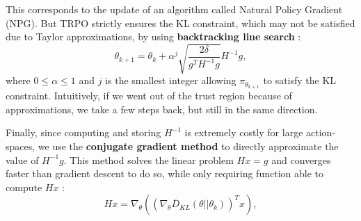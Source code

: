 \documentclass[10pt,landscape]{article}
\begin{document}
\begin{multicols}{3}
This corresponds to the update of an algorithm called Natural Policy Gradient (NPG). But TRPO strictly ensures the KL constraint, which may not be satisfied due to Taylor approximations, by using \textbf{backtracking line search} :
$$ \theta_{k+1} = \theta_k + \alpha^j \sqrt{\frac{2 \delta}{g^T H^{-1} g}} H^{-1} g, $$
where $0 \leqslant \alpha \leqslant 1$ and $j$ is the smallest integer allowing $\pi_{\theta_{k+1}}$ to satisfy the KL constraint. Intuitively, if we went out of the trust region because of approximations, we take a few steps back, but still in the same direction.\\
\medskip

Finally, since computing and storing $H^{-1}$ is extremely costly for large action-spaces, we use the \textbf{conjugate gradient method} to directly approximate the value of $H^{-1}g$. This method solves the linear problem $Hx = g$ and converges faster than gradient descent to do so, while only requiring function able to compute $Hx$ :
$$ Hx = \nabla_{\theta} \left( \left(\nabla_{\theta} \overline{D}_{KL}(\theta || \theta_k)\right)^T x \right), $$


\end{multicols}
\end{document}
